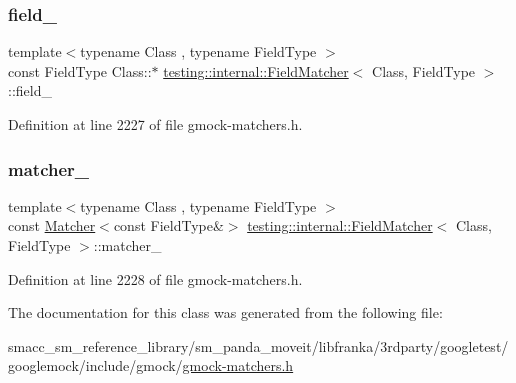 \subsubsection{\texorpdfstring{field\+\_\+}{field\_}}
{\footnotesize\ttfamily template$<$typename Class , typename Field\+Type $>$ \\
const Field\+Type Class\+::$\ast$ \hyperlink{classtesting_1_1internal_1_1FieldMatcher}{testing\+::internal\+::\+Field\+Matcher}$<$ Class, Field\+Type $>$\+::field\+\_\+\hspace{0.3cm}{\ttfamily [private]}}



Definition at line 2227 of file gmock-\/matchers.\+h.

\mbox{\label{classtesting_1_1internal_1_1FieldMatcher_a14eca9e5ca69aabaa9fe288effb1f57c}} 
\subsubsection{\texorpdfstring{matcher\+\_\+}{matcher\_}}
{\footnotesize\ttfamily template$<$typename Class , typename Field\+Type $>$ \\
const \hyperlink{classtesting_1_1Matcher}{Matcher}$<$const Field\+Type\&$>$ \hyperlink{classtesting_1_1internal_1_1FieldMatcher}{testing\+::internal\+::\+Field\+Matcher}$<$ Class, Field\+Type $>$\+::matcher\+\_\+\hspace{0.3cm}{\ttfamily [private]}}



Definition at line 2228 of file gmock-\/matchers.\+h.



The documentation for this class was generated from the following file\+:\begin{DoxyCompactItemize}
\item 
smacc\+\_\+sm\+\_\+reference\+\_\+library/sm\+\_\+panda\+\_\+moveit/libfranka/3rdparty/googletest/googlemock/include/gmock/\hyperlink{gmock-matchers_8h}{gmock-\/matchers.\+h}\end{DoxyCompactItemize}
